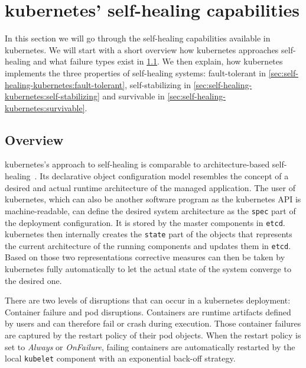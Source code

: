 
\section{\Gls{kubernetes}' self-healing capabilities}\label{sec:self-healing-kubernetes}
  In this section we will go through the self-healing capabilities available in \gls{kubernetes}.
  We will start with a short overview how \gls{kubernetes} approaches self-healing and what failure types exist in \cref{sec:self-healing-kubernetes:overview}.
  We then explain, how \gls{kubernetes} implements the three properties of self-healing systems: fault-tolerant in \cref{sec:self-healing-kubernetes:fault-tolerant}, self-stabilizing in \cref{sec:self-healing-kubernetes:self-stabilizing} and survivable in \cref{sec:self-healing-kubernetes:survivable}.

\subsection{Overview}\label{sec:self-healing-kubernetes:overview}
  \gls{kubernetes}'s approach to self-healing is comparable to architecture-based self-healing~\cite{ToffettiMicroservices,DashofyArchitecture}.
  Its declarative object configuration model resembles the concept of a desired and actual runtime architecture of the managed application.
  The user of \gls{kubernetes}, which can also be another software program as the \gls{kubernetes} API is machine-readable, can define the desired system architecture as the \texttt{spec} part of the deployment configuration.
  It is stored by the master components in \texttt{etcd}.
  \Gls{kubernetes} then internally creates the \texttt{state} part of the objects that represents the current architecture of the running components and updates them in \texttt{etcd}.
  Based on those two representations corrective measures can then be taken by \gls{kubernetes} fully automatically to let the actual state of the system converge to the desired one.

  There are two levels of disruptions that can occur in a \gls{kubernetes} deployment: Container failure and pod disruptions.
  Containers are runtime artifacts defined by users and can therefore fail or crash during execution.
  Those container failures are captured by the restart policy of their pod objects.
  When the restart policy is set to \textit{Always} or \textit{OnFailure}, failing containers are automatically restarted by the local \texttt{kubelet} component with an exponential back-off strategy.

